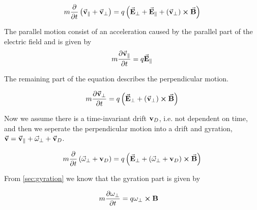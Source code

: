 	\begin{equation}
		m\pdv{}{t}\left( \va{v}_\parallel + \va{v}_\perp \right) =
		q \left( \va{E}_\perp + \va{E}_\parallel + \left( \va{v}_\perp\right)  \cross \va{B}\right)
	\end{equation}

	The parallel motion consist of an acceleration caused by the parallel part of the electric field and
	is given by
	\begin{equation}
		m\pdv{\va{v}_\parallel}{t} = q \va{E}_\parallel
	\end{equation}

	The remaining part of the equation describes the perpendicular motion.

	\begin{equation}
		m\pdv{\va{v}_\perp}{t}  = q \left( \va{E}_\perp +  \left( \va{v}_\perp\right)  \cross \va{B}\right)
	\end{equation}

	Now we assume there is a time-invariant drift \(\vb{v}_D\), i.e. not dependent on time, and
	then we seperate the perpendicular motion into a drift and gyration,
	\(\va{v} = \va{v}_\parallel + \va{\omega}_\perp + \va{v}_D\).

	\begin{equation}
		m\pdv{}{t} \left( \va{\omega}_\perp + \vb{v}_D \right) =
		q \left( \va{E}_\perp +  \left( \va{\omega}_\perp + \vb{v}_D \right)  \cross \va{B}\right)
	\end{equation}



	From \cref{sec:gyration} we know that the gyration part is given by

	\begin{align}
		m\pdv{\vb{\omega}_\perp}{t} &= q\vb{\vb{\omega}_\perp}\cross\vb{B}
	\end{align}


